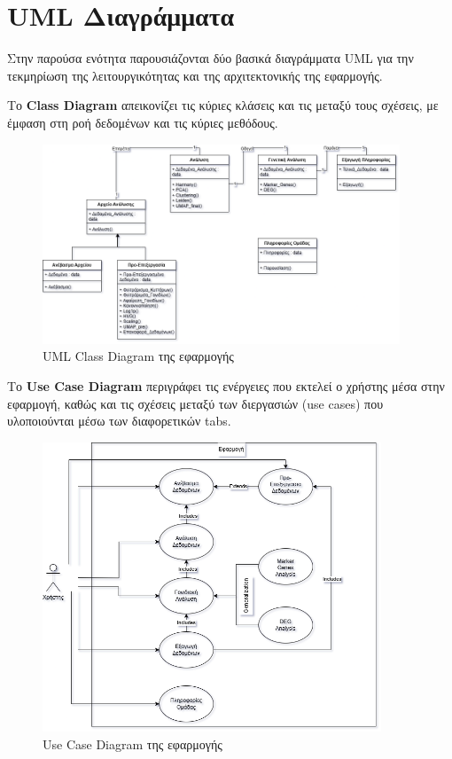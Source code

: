 \chapter{\foreignlanguage{english}{UML} Διαγράμματα}

Στην παρούσα ενότητα παρουσιάζονται δύο βασικά διαγράμματα \foreignlanguage{english}{UML} για την τεκμηρίωση της λειτουργικότητας και της αρχιτεκτονικής της εφαρμογής.

Το \foreignlanguage{english}{\textbf{Class Diagram}} απεικονίζει τις κύριες κλάσεις και τις μεταξύ τους σχέσεις, με έμφαση στη ροή δεδομένων και τις κύριες μεθόδους.

\begin{figure}[h]
    \centering
    \includegraphics[width=0.95\textwidth]{images/Class_Diagram.png}
    \caption{\foreignlanguage{english}{UML Class Diagram} της εφαρμογής}
\end{figure}

\newpage

Το \foreignlanguage{english}{\textbf{Use Case Diagram}} περιγράφει τις ενέργειες που εκτελεί ο χρήστης μέσα στην εφαρμογή, καθώς και τις σχέσεις μεταξύ των διεργασιών \foreignlanguage{english}{(use cases)} που υλοποιούνται μέσω των διαφορετικών \foreignlanguage{english}{tabs}.

\begin{figure}[h]
    \centering
    \includegraphics[width=0.9\textwidth]{images/Use_Case_Diagram.png}
    \caption{\foreignlanguage{english}{Use Case Diagram} της εφαρμογής}
\end{figure}
